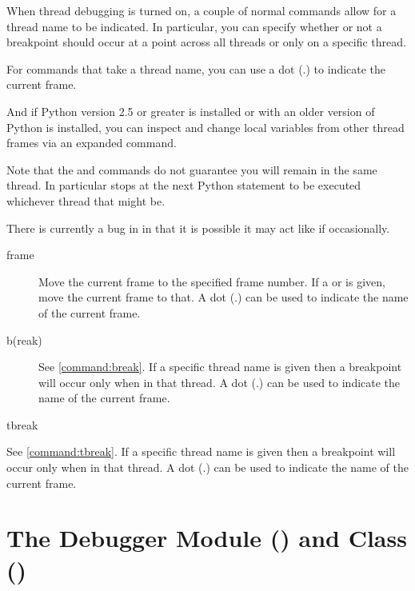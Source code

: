 When thread debugging is turned on, a couple of normal 
commands allow for a thread name to be indicated. In particular, you
can specify whether or not a breakpoint should occur at a point across
all threads or only on a specific thread. 

For commands that take a thread name, you can use a dot (.) to
indicate the current frame.

And if Python version 2.5 or greater is installed or
with an older version of Python is installed, you can inspect and change
local variables from other thread frames via an expanded 
command.

Note that the  and  commands do not guarantee
you will remain in the same thread. In particular  stops at
the next Python statement to be executed whichever thread that might
be.

There is currently a bug in  in that it is possible it may
act like  if occasionally.

\begin{description}
\item[frame  ]

Move the current frame to the specified frame number. If a
 or is given, move the current
frame to that. A dot (.) can be used to indicate the name of the
current frame.

\item[b(reak)
  ]
See \ref{command:break}. If a specific thread name is given then a
  breakpoint will occur only when in that thread. A dot (.) can be
  used to indicate the name of the current frame.

\item[tbreak
  ]
\end{description}
See \ref{command:tbreak}. If a specific thread name is given then a
  breakpoint will occur only when in that thread. A dot (.) can be
  used to indicate the name of the current frame.

\section{The Debugger Module () and Class () \label{pydb-module-class}}

